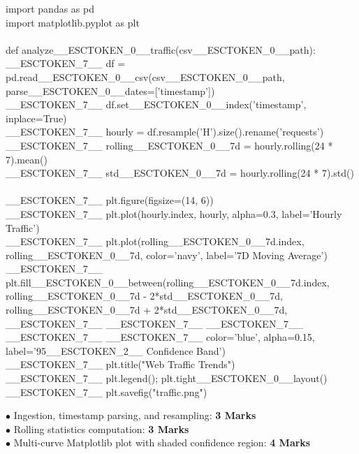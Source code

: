 \begin{solutionbox}
\begin{pycode}
import pandas as pd\\
import matplotlib.pyplot as plt\\
~\\
def analyze\_\_ESCTOKEN\_0\_\_traffic(csv\_\_ESCTOKEN\_0\_\_path):\\
\_\_ESCTOKEN\_7\_\_ df = pd.read\_\_ESCTOKEN\_0\_\_csv(csv\_\_ESCTOKEN\_0\_\_path, parse\_\_ESCTOKEN\_0\_\_dates=['timestamp'])\\
\_\_ESCTOKEN\_7\_\_ df.set\_\_ESCTOKEN\_0\_\_index('timestamp', inplace=True)\\
\_\_ESCTOKEN\_7\_\_ hourly = df.resample('H').size().rename('requests')\\
\_\_ESCTOKEN\_7\_\_ rolling\_\_ESCTOKEN\_0\_\_7d = hourly.rolling(24 * 7).mean()\\
\_\_ESCTOKEN\_7\_\_ std\_\_ESCTOKEN\_0\_\_7d = hourly.rolling(24 * 7).std()\\
~\\
\_\_ESCTOKEN\_7\_\_ plt.figure(figsize=(14, 6))\\
\_\_ESCTOKEN\_7\_\_ plt.plot(hourly.index, hourly, alpha=0.3, label='Hourly Traffic')\\
\_\_ESCTOKEN\_7\_\_ plt.plot(rolling\_\_ESCTOKEN\_0\_\_7d.index, rolling\_\_ESCTOKEN\_0\_\_7d, color='navy', label='7D Moving Average')\\
\_\_ESCTOKEN\_7\_\_ plt.fill\_\_ESCTOKEN\_0\_\_between(rolling\_\_ESCTOKEN\_0\_\_7d.index, rolling\_\_ESCTOKEN\_0\_\_7d - 2*std\_\_ESCTOKEN\_0\_\_7d, rolling\_\_ESCTOKEN\_0\_\_7d + 2*std\_\_ESCTOKEN\_0\_\_7d,\\
\_\_ESCTOKEN\_7\_\_ \_\_ESCTOKEN\_7\_\_ \_\_ESCTOKEN\_7\_\_ \_\_ESCTOKEN\_7\_\_ \_\_ESCTOKEN\_7\_\_ color='blue', alpha=0.15, label='95\_\_ESCTOKEN\_2\_\_ Confidence Band')\\
\_\_ESCTOKEN\_7\_\_ plt.title("Web Traffic Trends")\\
\_\_ESCTOKEN\_7\_\_ plt.legend(); plt.tight\_\_ESCTOKEN\_0\_\_layout()\\
\_\_ESCTOKEN\_7\_\_ plt.savefig("traffic.png")
\end{pycode}
\begin{markingrubric}
$\bullet$ Ingestion, timestamp parsing, and resampling: \textbf{3 Marks}\\$\bullet$ Rolling statistics computation: \textbf{3 Marks}\\$\bullet$ Multi-curve Matplotlib plot with shaded confidence region: \textbf{4 Marks}
\end{markingrubric}
\end{solutionbox}

